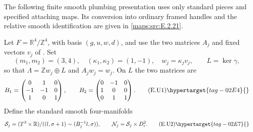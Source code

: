 \begin{proposition}\hypertarget{tag-02ML}{}\label{maps:src:E.2.20}


The following finite smooth plumbing presentation uses only standard
pieces and specified attaching maps. Its conversion into ordinary
framed handles and the relative smooth identification are given in \ref{maps:src:E.2.21}.

Let $F=\mathbb R^4/\mathbb Z^4$, with basis $(g,u,w,d)$, and use the
two matrices $A_j$ and fixed vectors $v_j$ of .  Set
\[
 (m_1,m_2)=(3,4),\quad(\kappa_1,\kappa_2)=(1,-1),\quad
 w_j=\kappa_jv_j,\qquad L=\ker\gamma,
\]
so that $\Lambda=\mathbb Zw_j\oplus L$ and $A_jw_j=w_j$.
On $L$ the two matrices are
\[
 B_1=\begin{pmatrix}0&1&0\\-1&-1&0\\1&0&1\end{pmatrix},
 \qquad
 B_2=\begin{pmatrix}0&-1&0\\1&0&0\\0&1&1\end{pmatrix}.
 \tag{E.U1}\hypertarget{tag-02E4}{}\label{maps:eq:E.U1}
\]
Define the standard smooth four-manifolds
\[
 \mathcal S_j=(T^3\times\mathbb R)/
       ((l,\sigma+1)\sim(B_j^{-1}l,\sigma)),
 \qquad \mathcal N_j=\mathcal S_j\times D^2_r.
 \tag{E.U2}\hypertarget{tag-02E7}{}\label{maps:eq:E.U2}
\]



\end{proposition}
